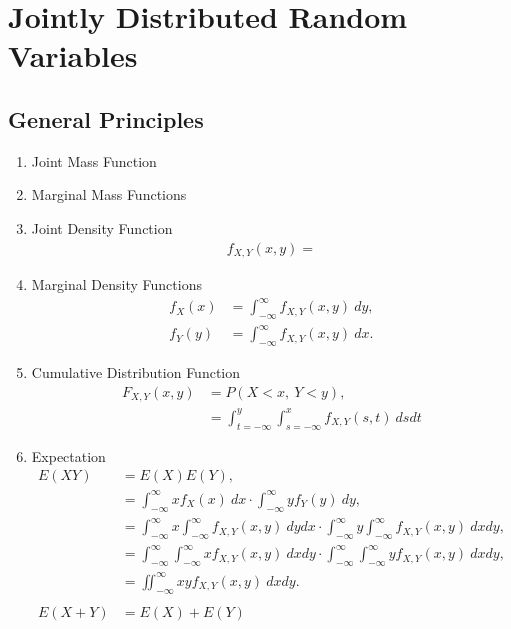 \documentclass{amsproc}
\begin{document}
	\section{Jointly Distributed Random Variables}
		\subsection{General Principles}
			\begin{enumerate}
				\item Joint Mass Function

				\item Marginal Mass Functions

				\item Joint Density Function
					\begin{align*}
						f_{X,Y}(x,y) = 
					\end{align*}

				\item Marginal Density Functions
					\begin{align*}
						f_{X}(x) &= \int_{-\infty}^{\infty} f_{X,Y}(x,y) \ dy, \\
						f_{Y}(y) &= \int_{-\infty}^{\infty} f_{X,Y}(x,y) \ dx.
					\end{align*}

				\item Cumulative Distribution Function
					\begin{align*}
						F_{X,Y}(x,y) &= P(X < x, \ Y < y), \\
						&= \int_{t = -\infty}^{y}\int_{s = -\infty}^{x} f_{X,Y}(s,t) \ dsdt
					\end{align*}

				\item Expectation
					\begin{align*}
						E(XY) &= E(X)E(Y), \\
						&= \int_{-\infty}^{\infty} x f_{X}(x) \ dx \cdot \int_{-\infty}^{\infty} y f_{Y}(y) \ dy, \\
						&= \int_{-\infty}^{\infty} x \int_{-\infty}^{\infty} f_{X,Y}(x,y) \ dydx \cdot \int_{-\infty}^{\infty} y \int_{-\infty}^{\infty} f_{X,Y}(x,y) \ dxdy, \\
						&= \int_{-\infty}^{\infty}\int_{-\infty}^{\infty} x f_{X,Y}(x,y) \ dxdy \cdot \int_{-\infty}^{\infty}\int_{-\infty}^{\infty} y f_{X,Y}(x,y) \ dxdy, \\
						&= \iint_{-\infty}^{\infty} xy f_{X,Y}(x,y) \ dxdy. \\
						\\
						E(X + Y) &= E(X) + E(Y)
					\end{align*}


\end{enumerate}
\end{document}
